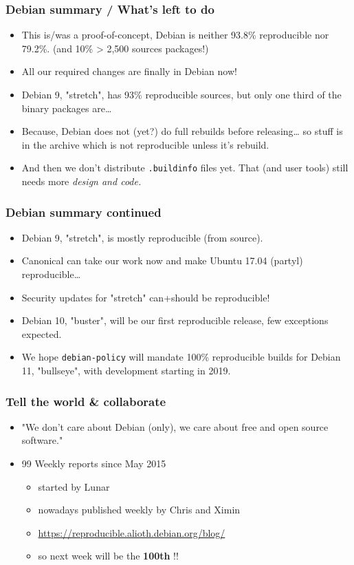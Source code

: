 \documentclass[14pt]{beamer}
\begin{document}
\begin{frame}
 \frametitle{Debian summary / What's left to do}
 \begin{itemize}
  \item This is/was a proof-of-concept, Debian is neither 93.8\% reproducible nor
  79.2\%. (and 10\% > 2,500 sources packages!)
  \item<2-3> All our required changes are finally in Debian now!
  \item<2-3> Debian 9, "stretch", has 93\% reproducible sources, but only one third of the binary packages are…
  \item<2-3> Because, Debian does not (yet?) do full rebuilds before
  releasing… so stuff is in the archive which is not reproducible unless it's
  rebuild.
  \item<3> And then we don't distribute \texttt{.buildinfo} files yet.
   That (and user tools) still needs more \it{design} and code.
 \end{itemize}
\end{frame}


\begin{frame}
 \frametitle{Debian summary continued}
 \begin{itemize}
  \item Debian 9, "stretch", is mostly reproducible (from source).
  \item Canonical can take our work now and make Ubuntu 17.04
  (partyl) reproducible…
  \item<2-4> Security updates for "stretch" can+should be reproducible!
  \item<3-4> Debian 10, "buster", will be our first reproducible release, few exceptions expected.
  \item<4> We hope \texttt{debian-policy} will mandate 100\%
  reproducible builds for Debian 11, "bullseye", with development starting in 2019.
 \end{itemize}
\end{frame}

\begin{frame}
 \frametitle{Tell the world \& collaborate}

 \begin{itemize}
  \item "We don't care about Debian (only), we care about free and open
   source software."
  \item<2-3> 99 Weekly reports since May 2015
   \begin{itemize}
    \item started by Lunar
    \item nowadays published weekly by Chris and Ximin
    \item \url{https://reproducible.alioth.debian.org/blog/}
  \item<3> so next week will be the \textbf{100th} !!
   \end{itemize}
    \end{itemize}
\end{frame}
\end{document}
